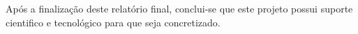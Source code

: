 
Após a finalização deste relatório final, conclui-se que este projeto possui suporte cientifico e tecnológico para que seja concretizado. 



